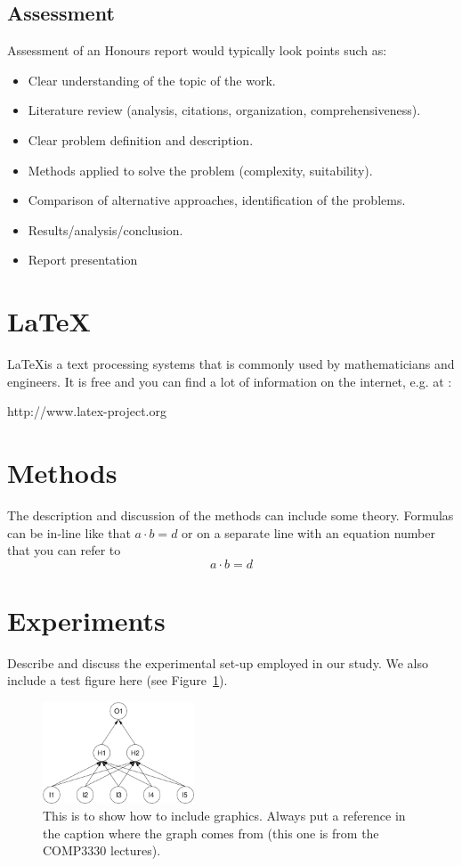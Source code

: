 \documentclass[a4,12pt]{article}
\begin{document}
\subsection{Assessment} \label{sec:assessment}
Assessment of an Honours report would typically look points such as:
\begin{itemize}
\item Clear understanding of the topic of the work.
\item Literature review (analysis, citations, organization, comprehensiveness).
\item Clear problem definition and description.
\item Methods applied to solve the problem (complexity, suitability).
\item Comparison of alternative approaches, identification of the problems.
\item Results/analysis/conclusion.
\item Report presentation
\end{itemize}

%
\section{\LaTeX}
%
\LaTeX is a text processing systems that is commonly used by mathematicians and engineers. It is free and you can find a lot of information on the internet, e.g. at : 
\begin{center}
http://www.latex-project.org
\end{center}

%
\section{Methods}
%
The description and discussion of the methods can include some theory. Formulas can be in-line like that $a \cdot b = d$ or on a separate line with an equation number that you can refer to
\begin{equation}
a \cdot b = d
\end{equation}
%
\section{Experiments}
%
Describe and discuss the experimental set-up employed in our study. We also include a test figure here (see Figure~\ref{fig:nn1}). 
\begin{figure}[htbp]
\begin{center}
    \leavevmode
    \includegraphics[width=45mm]{figure.pdf}
\caption{This is to show how to include graphics. Always put a reference in the caption where the graph comes from (this one is from the COMP3330 lectures).}
\label{fig:nn1}
\end{center}
\end{figure}
%
\end{document}
